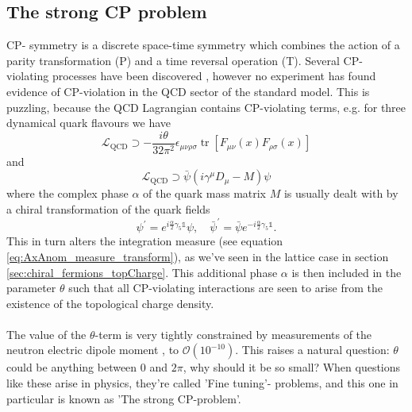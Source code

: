\documentclass[a4paper,10pt]{article}
\begin{document}
\subsection{The strong CP problem}
CP- symmetry is a discrete space-time symmetry which combines the action of a parity transformation (P) and a time reversal operation (T). Several CP- violating processes have been discovered \cite{aaij2013first}\cite{aaij2019observation}, however no experiment has found evidence of CP-violation in the QCD sector of the standard model. This is puzzling, because the QCD Lagrangian contains CP-violating terms, e.g. for three dynamical quark flavours we have
\begin{equation}
\mathcal{L}_{\mathrm{QCD}} \supset -\frac{i\theta }{32\pi^2}\epsilon_{\mu \nu \rho \sigma} \operatorname{tr}\left[F_{\mu \nu}(x) F_{\rho \sigma}(x)\right]
\end{equation}
and
\begin{equation}
\mathcal{L}_{\mathrm{QCD}} \supset \bar{\psi}\left(i \gamma^{\mu} D_{\mu}-M \right) \psi
\end{equation}
where the complex phase $\alpha$ of the quark mass matrix $M$ is usually dealt with by a chiral transformation of the quark fields
\begin{equation}
\psi^{\prime}=e^{i \frac{\alpha}{2} \gamma_{5}\mathbb{1}} \psi, \quad \bar{\psi}^{\prime}=\bar{\psi} e^{-i \frac{\alpha}{2} \gamma_{5}\mathbb{1}}.
\end{equation}
This in turn alters the integration measure (see equation \eqref{eq:AxAnom_measure_transform}), as we've seen in the lattice case in section \ref{sec:chiral_fermions_topCharge}. This additional phase $\alpha$ is then included in the parameter $\theta$ such that all CP-violating interactions are seen to arise from the existence of the topological charge density.\\\\The value of the $\theta$-term is very tightly constrained by measurements of the neutron electric dipole moment \cite{PhysRevLett.97.131801}, to $\mathcal{O}(10^{-10})$. This raises a natural question: $\theta$ could be anything between $0$ and $2\pi$, why should it be so small? When questions like these arise in physics, they're called 'Fine tuning'- problems, and this one in particular is known as 'The strong CP-problem'. 
\end{document}
